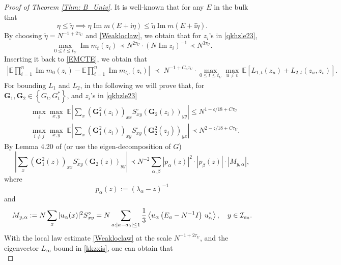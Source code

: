 \documentclass[10pt,reqno]{article}
\DeclareMathOperator{\im}{{\mathrm{Im}}}
\theoremstyle{plain} %
\theoremstyle{remark}
\numberwithin{equation}{section}
\begin{document}
\begin{proof}[Proof of Theorem \ref{Thm: B_Univ}]
It is well-known that  for any $E$ in the bulk that 
$$
\eta\le \widetilde{\eta}\implies\eta \operatorname{Im} m\left(E +\mathrm{i} \eta \right) \leq \tilde{\eta} \operatorname{Im} m\left(E +\mathrm{i} \tilde{\eta}\right).
$$ 
By choosing $\widetilde{\eta}=N^{-1+2\tau_U}$ and \eqref{Weakloclaw}, we obtain that for $z_i$'s in \eqref{qkhzle23}, 
$$
\max_{0\le t\le t_U}\im m_t (z_i)\prec N^{2\tau_U}\cdot (N\im z_i)^{-1}\prec N^{3\tau_U}.$$
Inserting  it back to \eqref{EMCTE}, we obtain that
\begin{align}\label{EMCTE2}
 \left|\mathbb{E} \prod_{i=1}^n \operatorname{Im} m_0\left(z_i\right)-\mathbb{E} \prod_{i=1}^n \operatorname{Im} m_{t_U}\left(z_i\right)\right|
\;\prec\;  N^{-1+C_n\tau_U}\cdot  \max_{0\le t\le t_U}\max_{u\ne v}\,\mathbb{E}\left[  L_{1, t}\left(z_u\right)  +  L_{2, t}\left(z_u, z_v\right)\right].
\end{align}
For bounding $L_1$ and $L_2$, in the following we will prove that, for $\mathbf{G}_1, \mathbf{G}_2 \in\left\{G_t, G_t^*\right\}$,  and $z_i$'s in \eqref{qkhzle23}
\begin{align}\label{jaklsdufowe}
  & \max_i\max_{x,y}\; \mathbb E\left| \sum_{ x}\left(\mathbf{G}_1^2(z_i)\right)_{x x} S_{x y}^{\circ}\left(\mathbf{G}_2(z_i)\right)_{yy}\right|\le N^{1-\mathfrak c/18+C\tau_U} \\\label{uywy7723r3rf}
 & \max_{i\ne j}\max_{x,y}\;\mathbb E\left|  \sum_{  x}\left(\mathbf{G}_1^2\left(z_i\right)\right)_{xy} S_{x y}^{\circ}\left(\mathbf{G}_2^2\left(z_j\right)\right)_{yx}\right| \prec N^{2-\mathfrak c/18+C\tau_U}.
\end{align}
By Lemma 4.20 of \cite{Xu:2024aa} (or use the eigen-decomposition
of $G$) 
\begin{equation}\label{yw982823}
     \left|\sum_{x}\left(\mathbf{G}_1^2(z)\right)_{xx} S_{x y}^{\circ}\left(\mathbf{G}_2(z)\right)_{yy}\right|\prec N^{-2}\sum_{\alpha,\beta} |p_\alpha(z)|^2 \cdot |p_\beta(z)|\cdot \left| M_{y,\alpha} \right| ,
\end{equation}
where $$p_\alpha(z):=\left(\lambda_\alpha-z\right)^{-1}$$
and 
$$
     M_{y,\alpha}:= N \sum_{x}|u_\alpha(x)|^2 S^{\circ}_{xy}= N \sum_{a: |a-a_0|\le 1}\frac13
     \left\langle u_\alpha \left(E_a-N^{-1} I\right) \,u^*_\alpha\right\rangle, \quad y\in {\cal I}_{a_0}.
$$
With the  local law estimate \eqref{Weakloclaw} at the scale $N^{-1+2\tau_U}$, and the  eigenvector $L_\infty$ bound in  \eqref{kkzxis}, one can obtain that 
\begin{equation}\label{80whg}

\end{equation}
\end{proof}
\end{document}
